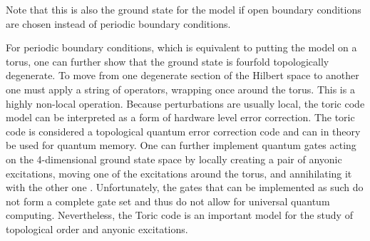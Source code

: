 Note that this is also the ground state for the model if open boundary conditions are chosen instead of periodic boundary conditions. \par
For periodic boundary conditions, which is equivalent to putting the model on a torus, one can further show that the ground state is fourfold topologically degenerate. To move from one degenerate section of the Hilbert space to another one must apply a string of operators, wrapping once around the torus. This is a highly non-local operation. Because perturbations are usually local, the toric code model can be interpreted as a form of hardware level error correction. The toric code is considered a topological quantum error correction code and can in theory be used for quantum memory. One can further implement quantum gates acting on the 4-dimensional ground state space by locally creating a pair of anyonic excitations, moving one of the excitations around the torus, and annihilating it with the other one \cite{cite:fault_tolerant_quantum_computation_by_anyons}. Unfortunately, the gates that can be implemented as such do not form a complete gate set and thus do not allow for universal quantum computing. Nevertheless, the Toric code is an important model for the study of topological order and anyonic excitations.